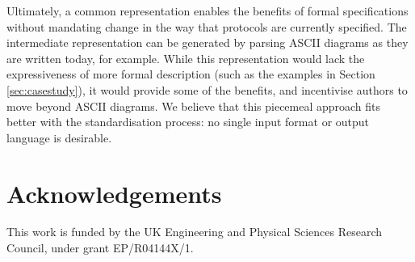 \documentclass[10pt,sigconf]{acmart}
\begin{document}
Ultimately, a common representation enables the benefits of formal specifications without
mandating change in the way that protocols are currently specified. The intermediate
representation can be generated by parsing ASCII diagrams as they are written today, for
example. While this representation would lack the expressiveness of more formal
description (such as the examples in Section \ref{sec:casestudy}), it would provide some
of the benefits, and incentivise authors to move beyond ASCII diagrams. We believe that
this piecemeal approach fits better with the standardisation process: no single input
format or output language is desirable.

\section{Acknowledgements}

This work is funded by the UK Engineering and Physical Sciences Research Council, under
grant EP/R04144X/1.

\balance


\end{document}
